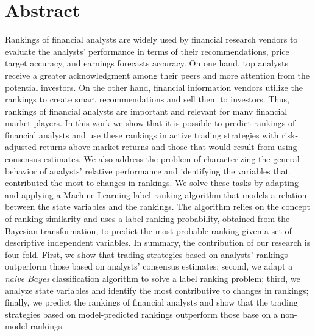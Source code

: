 \chapter*{Abstract}
Rankings of financial analysts are widely used by  financial research vendors to evaluate the analysts' performance in terms of their recommendations, price target accuracy, and earnings forecasts accuracy. On one hand, top analysts receive a greater acknowledgment among their peers and more attention from the potential investors. On the other hand, financial information vendors utilize the rankings to create smart recommendations  and sell them to investors. Thus, rankings of financial analysts are important and relevant for many financial market players. In this work we show that it is possible to predict rankings of financial analysts and use these rankings in active trading strategies with risk-adjusted returns above market returns and those that would result from using consensus estimates. We also address the problem of characterizing the general behavior of analysts' relative performance and identifying the variables that contributed the most to changes in rankings.  We solve these tasks by adapting and applying a Machine Learning label ranking algorithm that models a relation between the state variables and the rankings. The algorithm relies on the concept of ranking similarity and uses a label ranking probability, obtained from the Bayesian transformation, to predict the most probable ranking given a set of descriptive independent variables.  In summary, the contribution of our research is four-fold. First, we show that trading strategies based on analysts' rankings outperform those based on analysts' consensus estimates; second, we adapt a \emph{naive Bayes} classification algorithm to solve a label ranking problem; third, we analyze  state variables and identify the most contributive to changes in rankings; finally, we predict the rankings of financial analysts and show that the  trading strategies based on model-predicted rankings outperform those base on a non-model rankings.
